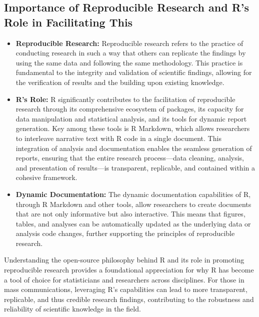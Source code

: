 \documentclass[
]{book}
\begin{document}
\hypertarget{importance-of-reproducible-research-and-rs-role-in-facilitating-this}{%
\subsection*{Importance of Reproducible Research and R's Role in Facilitating This}\label{importance-of-reproducible-research-and-rs-role-in-facilitating-this}}

\begin{itemize}
\item
  \textbf{Reproducible Research:} Reproducible research refers to the practice of conducting research in such a way that others can replicate the findings by using the same data and following the same methodology. This practice is fundamental to the integrity and validation of scientific findings, allowing for the verification of results and the building upon existing knowledge.
\item
  \textbf{R's Role:} R significantly contributes to the facilitation of reproducible research through its comprehensive ecosystem of packages, its capacity for data manipulation and statistical analysis, and its tools for dynamic report generation. Key among these tools is R Markdown, which allows researchers to interleave narrative text with R code in a single document. This integration of analysis and documentation enables the seamless generation of reports, ensuring that the entire research process---data cleaning, analysis, and presentation of results---is transparent, replicable, and contained within a cohesive framework.
\item
  \textbf{Dynamic Documentation:} The dynamic documentation capabilities of R, through R Markdown and other tools, allow researchers to create documents that are not only informative but also interactive. This means that figures, tables, and analyses can be automatically updated as the underlying data or analysis code changes, further supporting the principles of reproducible research.
\end{itemize}

Understanding the open-source philosophy behind R and its role in promoting reproducible research provides a foundational appreciation for why R has become a tool of choice for statisticians and researchers across disciplines. For those in mass communications, leveraging R's capabilities can lead to more transparent, replicable, and thus credible research findings, contributing to the robustness and reliability of scientific knowledge in the field.
\end{document}
